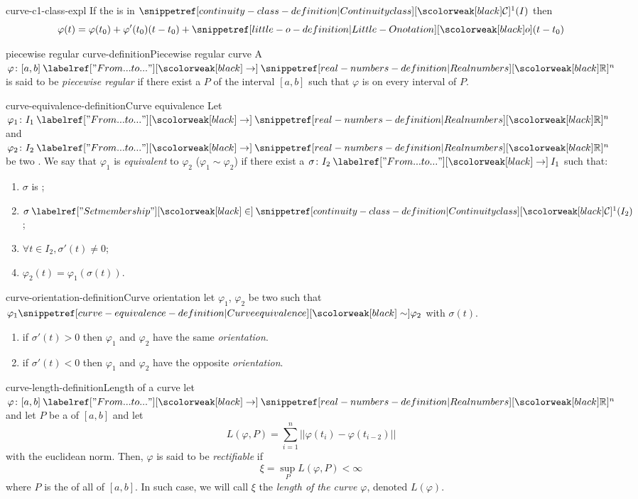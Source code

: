 \documentclass[preview]{standalone}
\begin{document}
\begin{snippet}{curve-c1-class-expl}
    If the \curve is in \(\continuityclass^1(I)\) then \[
        \varphi(t) = \varphi(t_0) + \varphi'(t_0)(t-t_0) + \littleO(t-t_0)
    \]
\end{snippet}

\begin{snippetdefinition}{piecewise regular curve-definition}{Piecewise regular curve}
    A \curve \(\varphi \colon [a,b] \fromto \realnumbers^n\) is said to be \emph{piecewise regular}
    if there exist a \partition \(P\) of the interval \([a,b]\) such that
    \(\varphi\) is \regularcurve on every interval of \(P\).
\end{snippetdefinition}

\begin{snippetdefinition}{curve-equivalence-definition}{Curve equivalence}
    Let \(\varphi_1 \colon I_1 \fromto \realnumbers^n\)
    and \(\varphi_2 \colon I_2 \fromto \realnumbers^n\) be two \curve[curves].
    We say that \(\varphi_1\)
    is \emph{equivalent} to \(\varphi_2\) (\(\varphi_1 \sim \varphi_2\)) if there exist
    a \function \(\sigma \colon I_2 \fromto I_1\) such that:
    \begin{enumerate}
        \item \(\sigma\) is \surjective;
        \item \(\sigma \in \continuityclass^1(I_2)\);
        \item \(\forall t \in I_2, \sigma'(t) \neq 0\);
        \item \(\varphi_2(t) = \varphi_1(\sigma(t))\).
    \end{enumerate}
\end{snippetdefinition}

\begin{snippetdefinition}{curve-orientation-definition}{Curve orientation}
    let \(\varphi_1\), \(\varphi_2\) be two \curve[curves] such that \(\varphi_1 \curveequivalent \varphi_2\)
    with \(\sigma(t)\).
    \begin{enumerate}
        \item if \(\sigma'(t) > 0\) then \(\varphi_1\) and \(\varphi_2\) have the same \emph{orientation}.
        \item if \(\sigma'(t) < 0\) then \(\varphi_1\) and \(\varphi_2\) have the opposite \emph{orientation}.
    \end{enumerate}
\end{snippetdefinition}

\begin{snippetdefinition}{curve-length-definition}{Length of a curve}
    let \(\varphi \colon [a,b] \fromto \realnumbers^n\) and let \(P\) be a \partition of \([a,b]\)
    and let
    \[
        L(\varphi, P) = \sum_{i=1}^n ||\varphi(t_i) - \varphi(t_{i-2})||
    \]
    with the euclidean norm.
    Then, \(\varphi\) is said to be \emph{rectifiable} if
    \[
        \xi = \sup_P L(\varphi, P) < \infty
    \]
    where \(P\) is the \set of all \partition[partitions] of \([a,b]\).
    In such case, we will call \(\xi\)
    the \emph{length of the curve \(\varphi\)}, denoted \(L(\varphi)\).
\end{snippetdefinition}
\end{document}
